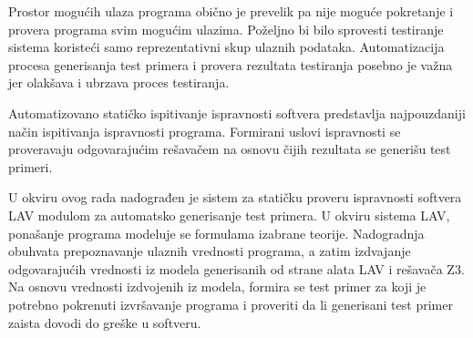 \documentclass[12pt,oneside]{memoir}
\begin{document}



Prostor mogućih ulaza programa obično je prevelik pa nije moguće pokretanje i provera programa svim mogućim ulazima. Poželjno bi bilo sprovesti testiranje sistema koristeći samo reprezentativni skup ulaznih podataka. Automatizacija procesa generisanja test primera i provera rezultata testiranja posebno je važna jer olakšava i ubrzava proces testiranja.

Automatizovano statičko ispitivanje ispravnosti softvera predstavlja najpouzdaniji način ispitivanja ispravnosti programa. Formirani uslovi ispravnosti se proveravaju odgovarajućim rešavačem na osnovu čijih rezultata se generišu test primeri.




U okviru ovog rada nadograđen je sistem za statičku proveru ispravnosti  softvera LAV modulom za automatsko generisanje test primera. U okviru sistema LAV, ponašanje programa modeluje se formulama izabrane teorije. Nadogradnja obuhvata prepoznavanje ulaznih vrednosti programa, a zatim izdvajanje odgovarajućih vrednosti iz modela generisanih od strane alata LAV i rešavača Z3. Na osnovu vrednosti izdvojenih iz modela, formira se test primer za koji je potrebno pokrenuti izvršavanje programa i proveriti da li generisani test primer zaista dovodi do greške u softveru.
\par
\end{document}
